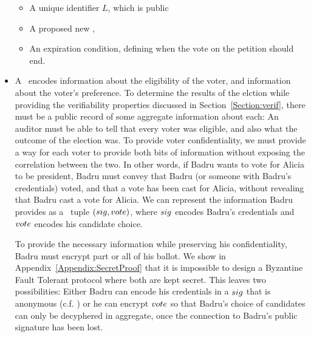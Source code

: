 \begin{itemize}
\begin{itemize}
      \item A unique identifier $L$, which is public
      \item A proposed new \KwManifest,
      \item An expiration condition, defining when the vote on the petition
        should end.
    \end{itemize}
  \item A \StructBallot~encodes information about the eligibility of the voter,
    and information about the voter's preference. To determine the results of
    the elction while providing the verifiability properties discussed in
    Section~\ref{Section:verif}, there must be a public record of some
    aggregate information about each: An auditor must be able to tell that every
    voter was eligible, and also what the outcome of the election was. To
    provide voter confidentiality, we must provide a way for each voter to
    provide both bits of information without exposing the correlation between
    the two. In other words, if Badru wants to vote for Alicia to be president,
    Badru must convey that Badru (or someone with Badru's credentials) voted,
    and that a vote has been cast for Alicia, without revealing that Badru cast
    a vote for Alicia. We can represent the information Badru provides as a
    \StructBallot~tuple $(sig, vote)$, where $sig$ encodes Badru's
    credentials and $vote$ encodes his candidate choice.

    To provide the necessary information while preserving his
    confidentiality, Badru must encrypt part or all of his ballot.
    We show
    in Appendix~\ref{Appendix:SecretProof} that it is impossible to design
    a Byzantine Fault Tolerant protocol where both are kept secret. This leaves
    two possibilities:
    Either Badru can encode his credentials in a $sig$ that is anonymous
    (c.f. \cite{lrs})
    or he can encrypt $vote$ so that Badru's choice of candidates can only be
    decyphered in aggregate, once the connection to Badru's public signature has
    been lost.

\end{itemize}


